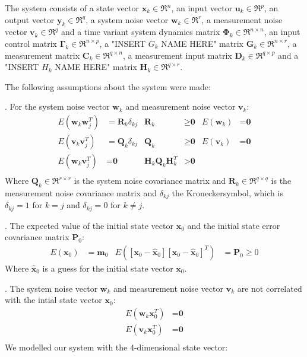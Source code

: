 \documentclass[class=article, crop=false]{standalone}
\begin{document}
The system consists of a state vector $ \textbf{x}_k  \in  \Re^n $, an input vector $ \textbf{u}_k \in \Re^p $, an output vector $ \textbf{y}_k \in \Re^q $, a system noise vector $ \textbf{w}_k \in \Re^r $, a measurement noise vector $ \textbf{v}_k \in \Re^q $ and a time variant system dynamics matrix $ \boldsymbol{\Phi}_k \in \Re^{n \times n}$,
an input control matrix $ \boldsymbol{\Gamma}_k \in \Re^{n \times p}$, a "INSERT $ G_k $ NAME HERE" matrix $ \boldsymbol{G}_k \in \Re^{n \times r} $, a measurement matrix $ \boldsymbol{C}_k \in \Re^{q \times n} $, a measurement input matrix $ \boldsymbol{D}_k \in \Re^{q \times p}$ and a "INSERT $ H_k $ NAME HERE" matrix $ \textbf{H}_k \in \Re^{q \times r} $.

\noindent
The following assumptions about the system were made:

. For the system noise vector $ \textbf{w}_k$ and measurement noise vector $ \textbf{v}_k $:
\begin{align*}
    E(\textbf{w}_k \textbf{w}_j^T) &= \textbf{R}_k \delta_{kj} & \textbf{R}_k &\ge \textbf{0} & E(\textbf{w}_k) &= \textbf{0} \\
    E(\textbf{v}_k \textbf{v}_j^T) &= \textbf{Q}_k \delta_{kj} & \textbf{Q}_k &\ge \textbf{0} & E(\textbf{v}_k) &= \textbf{0} \\
    E(\textbf{w}_k \textbf{v}_j^T) &= \textbf{0} & \textbf{H}_k  \textbf{Q}_k \textbf{H}_k^T &> \textbf{0}\\
\end{align*}\label{eq:assumption1}
Where $ \textbf{Q}_k \in \Re^{r \times r} $ is the system noise covariance matrix and $ \textbf{R}_k \in \Re^{q \times q} $ is the measurement noise covariance matrix and $ \delta_{kj} $ the Kroneckersymbol, which is $ \delta_{kj} = 1$ for $ k = j $ and $ \delta_{kj} = 0$ for $ k \neq j $.

\vspace{0.5cm}
. The expected value of the initial state vector $ \textbf{x}_0 $ and the initial state error covariance matrix $ \textbf{P}_0 $:
\begin{align*}
    E(\textbf{x}_0) &= \textbf{m}_0 & E([\textbf{x}_0 - \hat{\textbf{x}}_0][\textbf{x}_0 - \hat{\textbf{x}}_0]^T) &= \textbf{P}_0 \ge 0
\end{align*}\label{eq:assumption2}
Where $ \hat{\textbf{x}}_0 $ is a guess for the initial state vector $ \textbf{x}_0 $.

. The system noise vector $\textbf{w}_k$ and measurement noise vector $\textbf{v}_k$ are not correlated with the intial state vector $ \textbf{x}_0 $:
\begin{align*}
    E(\textbf{w}_k \textbf{x}_0^T) &= \textbf{0}\\
    E(\textbf{v}_k \textbf{x}_0^T)&= \textbf{0}\\
\end{align*}\label{eq:assumption3}
We modelled our system with the 4-dimensional state vector:
\end{document}
